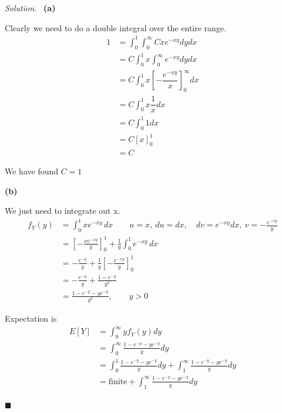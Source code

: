 \documentclass[11pt]{article}
\newenvironment{solution}
{\par\medskip\noindent\textit{Solution.}\ }
{\hfill$\blacksquare$\par\medskip}
\begin{document}
    \begin{solution}
        \textbf{(a)}

        Clearly we need to do a double integral over the entire range.
        \begin{align*}
            1 &= \int_{0}^{1} \int_{0}^{\infty} Cxe^{-xy} dy dx \\
            &= C \int_{0}^{1} x \int_{0}^{\infty} e^{-xy} dy dx \\
            &= C \int_{0}^{1} x \left[-\dfrac{e^{-xy}}{x}\right]_{0}^{\infty} dx \\
            &= C \int_{0}^{1} x \dfrac{1}{x} dx \\
            &= C \int_{0}^{1} 1 dx \\
            &= C \left[x\right]_{0}^{1} \\
            &= C
        \end{align*}

        We have found $C = 1$

        \vspace{1em}
        \textbf{(b)}

        We just need to integrate out x.
        \begin{align*}
            f_Y(y) &= \int_{0}^{1} x e^{-xy}\, dx
            \qquad u = x,\ du = dx,\quad dv = e^{-xy}dx,\ v = -\frac{e^{-xy}}{y} \\
            &= \left[-\frac{x e^{-xy}}{y}\right]_{0}^{1} + \frac{1}{y}\int_{0}^{1} e^{-xy}\, dx \\
            &= -\frac{e^{-y}}{y} + \frac{1}{y}\left[-\frac{e^{-xy}}{y}\right]_{0}^{1} \\
            &= -\frac{e^{-y}}{y} + \frac{1 - e^{-y}}{y^2} \\
            &= \frac{1 - e^{-y} - y e^{-y}}{y^2}, \qquad y > 0
        \end{align*}

        Expectation is
        \begin{align*}
            E[Y] &= \int_{0}^{\infty} y f_Y(y) dy \\
            &= \int_{0}^{\infty} \frac{1 - e^{-y} - y e^{-y}}{y} dy \\
            &= \int_{0}^{1} \frac{1 - e^{-y} - y e^{-y}}{y} dy + \int_{1}^{\infty} \frac{1 - e^{-y} - y e^{-y}}{y} dy \\
            &= \text{finite} + \int_{1}^{\infty} \frac{1 - e^{-y} - y e^{-y}}{y} dy
        \end{align*}


\end{solution}
\end{document}
